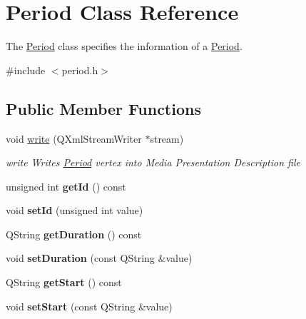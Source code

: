 \hypertarget{class_period}{\section{Period Class Reference}
\label{class_period}
}


The \hyperlink{class_period}{Period} class specifies the information of a \hyperlink{class_period}{Period}.  




{\ttfamily \#include $<$period.\-h$>$}

\subsection*{Public Member Functions}
\begin{DoxyCompactItemize}
\item 
void \hyperlink{class_period_afa22d2b626be153a49ae9194f6027676}{write} (Q\-Xml\-Stream\-Writer $\ast$stream)
\begin{DoxyCompactList}\small\item\em write Writes \hyperlink{class_period}{Period} vertex into Media Presentation Description file \end{DoxyCompactList}\item 
\hypertarget{class_period_a8e7139a1e32f58faca736d4162998035}{unsigned int {\bfseries get\-Id} () const }\label{class_period_a8e7139a1e32f58faca736d4162998035}

\item 
\hypertarget{class_period_ae13d617aa1a99d6aabfe33bb3dff5ead}{void {\bfseries set\-Id} (unsigned int value)}\label{class_period_ae13d617aa1a99d6aabfe33bb3dff5ead}

\item 
\hypertarget{class_period_a842f7763b3ee02b3196808d7434e83d2}{Q\-String {\bfseries get\-Duration} () const }\label{class_period_a842f7763b3ee02b3196808d7434e83d2}

\item 
\hypertarget{class_period_a8df6ac7816e627e71561dff34475df5d}{void {\bfseries set\-Duration} (const Q\-String \&value)}\label{class_period_a8df6ac7816e627e71561dff34475df5d}

\item 
\hypertarget{class_period_a175391b527970b3ccc3a14c1a7d5fd8f}{Q\-String {\bfseries get\-Start} () const }\label{class_period_a175391b527970b3ccc3a14c1a7d5fd8f}

\item 
\hypertarget{class_period_a7740fb9322048f6def916cae7cbbd5e2}{void {\bfseries set\-Start} (const Q\-String \&value)}\label{class_period_a7740fb9322048f6def916cae7cbbd5e2}


\end{DoxyCompactItemize}
